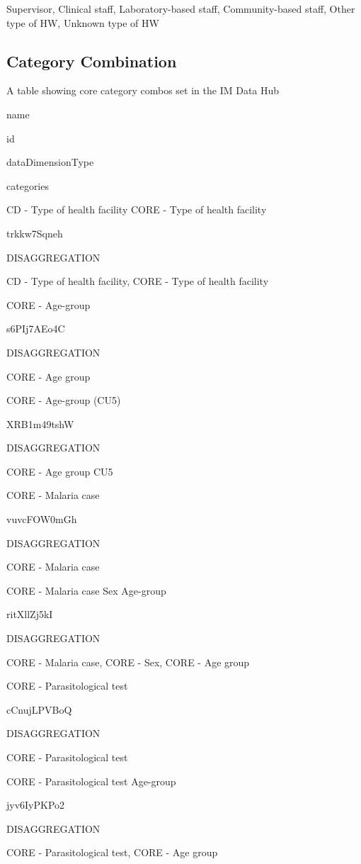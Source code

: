 \documentclass[]{book}
\begin{document}
Supervisor, Clinical staff, Laboratory-based staff, Community-based staff, Other type of HW, Unknown type of HW

\hypertarget{category-combination}{%
\subsection{Category Combination}\label{category-combination}}

\label{tab:unnamed-chunk-15}A table showing core category combos set in the IM Data Hub

name

id

dataDimensionType

categories

CD - Type of health facility \textbar{} CORE - Type of health facility

trkkw7Sqneh

DISAGGREGATION

CD - Type of health facility, CORE - Type of health facility

CORE - Age-group

s6PIj7AEo4C

DISAGGREGATION

CORE - Age group

CORE - Age-group (CU5)

XRB1m49tshW

DISAGGREGATION

CORE - Age group CU5

CORE - Malaria case

vuvcFOW0mGh

DISAGGREGATION

CORE - Malaria case

CORE - Malaria case \textbar{} Sex \textbar{} Age-group

ritXllZj5kI

DISAGGREGATION

CORE - Malaria case, CORE - Sex, CORE - Age group

CORE - Parasitological test

cCnujLPVBoQ

DISAGGREGATION

CORE - Parasitological test

CORE - Parasitological test \textbar{} Age-group

jyv6IyPKPo2

DISAGGREGATION

CORE - Parasitological test, CORE - Age group
\end{document}
